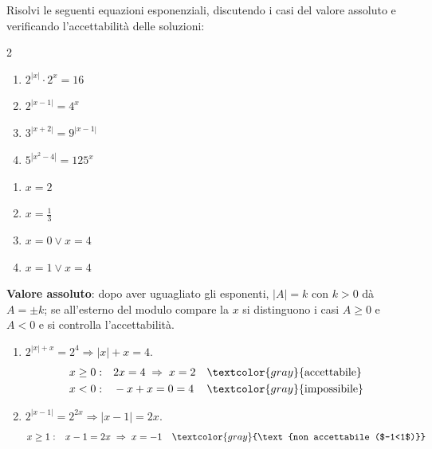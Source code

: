 
\begin{question}[ID=4.5, subtitle={Valore assoluto e incognita anche fuori dal modulo}, difficulty=difficile, tags={equazioni, esponenziali, valore assoluto}]
Risolvi le seguenti equazioni esponenziali, discutendo i casi del valore assoluto e verificando l'accettabilità delle soluzioni:
\begin{center}\begin{minipage}{0.92\linewidth}
\begin{multicols}{2}
\begin{enumerate}[leftmargin=3.2cm]
\item $2^{|x|} \cdot 2^{x} = 16$
\item $2^{|x-1|} = 4^{x}$
\item $3^{|x+2|} = 9^{|x-1|}$
\item $5^{|x^2-4|} = 125^{x}$
\end{enumerate}
\end{multicols}
\end{minipage}\end{center}
\begin{solution}
\begin{enumerate}
    \item $x=2$
    \item $x=\tfrac13$
    \item $x=0\vee x=4$
    \item $x=1\vee x=4$
\end{enumerate}
\end{solution}
\begin{explanation}
\textbf{Valore assoluto}: dopo aver uguagliato gli esponenti, $|A|=k$ con $k>0$ dà $A=\pm k$; se all'esterno del modulo compare la $x$ si distinguono i casi $A\geq0$ e $A<0$ e si controlla l'accettabilità.
\begin{enumerate}
    \item $2^{|x|+x}=2^4 \Rightarrow |x|+x=4$.
    \[\begin{aligned}
    x\geq0: &\quad 2x=4 \;\Rightarrow\; x=2 && \textcolor{gray}{\text{accettabile}}\\
    x<0: &\quad -x+x=0=4 && \textcolor{gray}{\text{impossibile}}
    \end{aligned}\]
    \item $2^{|x-1|}=2^{2x} \Rightarrow |x-1|=2x$.
    \[\begin{aligned}
    x\geq1: &\quad x-1=2x \;\Rightarrow\; x=-1 && \textcolor{gray}{\text{non accettabile ($-1<1$)}}\\

\end{aligned}\]
\end{enumerate}
\end{explanation}
\end{question}

